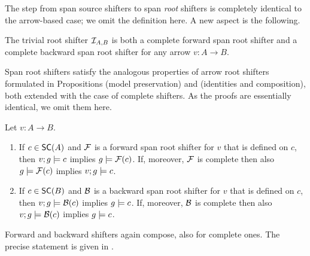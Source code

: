 \medskip\noindent
The step from span source shifters to span \emph{root} shifters is completely identical to the arrow-based case; we omit the definition here. A new aspect is the following.

\begin{proposition}
The trivial root shifter $\mathcal{I}_{A,B}$ is both a complete forward span root shifter and a complete backward span root shifter for any arrow $v:A\to B$. 
\end{proposition}
%
Span root shifters satisfy the analogous properties of arrow root shifters formulated in Propositions  (model preservation) and  (identities and composition), both extended with the case of complete shifters. 
\iffull
As the proofs are essentially identical, we omit them here. 
\fi

\begin{proposition}
Let $v:A\to B$.
\begin{enumerate}[topsep=\smallskipamount]
\item If $c\in \SC A$ and $\mathcal{F}$ is a forward span root shifter for $v$ that is defined on $c$, then $v;g\models c$ implies $g\models \mathcal{F}(c)$. If, moreover, $\mathcal{F}$ is complete then also $g\models \mathcal{F}(c)$ implies $v;g\models c$.
\item If $c\in \SC B$ and $\mathcal{B}$ is a backward span root shifter for $v$ that is defined on $c$, then $v;g\models \mathcal{B}(c)$ implies $g\models c$. If, moreover, $\mathcal{B}$ is complete then also $v;g\models \mathcal{B}(c)$ implies $g\models c$.
\end{enumerate}
\end{proposition}
%
Forward and backward shifters again compose, also for complete ones.
\iffest
The precise statement is given in .
\fi

